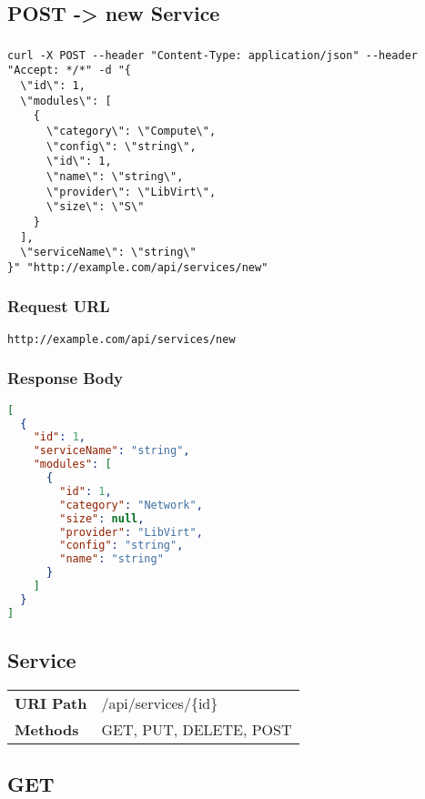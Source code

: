 \subsection{POST -> new Service}
\subsubsection{}
\begin{lstlisting}[style=Bash] 
curl -X POST --header "Content-Type: application/json" --header "Accept: */*" -d "{
  \"id\": 1,
  \"modules\": [
    {
      \"category\": \"Compute\",
      \"config\": \"string\",
      \"id\": 1,
      \"name\": \"string\",
      \"provider\": \"LibVirt\",
      \"size\": \"S\"
    }
  ],
  \"serviceName\": \"string\"
}" "http://example.com/api/services/new"
\end{lstlisting}

\subsubsection{Request URL}
\begin{lstlisting}[] 
http://example.com/api/services/new
\end{lstlisting}

\subsubsection{Response Body}
\begin{lstlisting}[language=json] 
[
  {
    "id": 1,
    "serviceName": "string",
    "modules": [
      {
        "id": 1,
        "category": "Network",
        "size": null,
        "provider": "LibVirt",
        "config": "string",
        "name": "string"
      }
    ]
  }
]
\end{lstlisting}





\subsection{Service}
\begin{tabularx}{\linewidth}{l l}
\textbf{URI Path} & /api/services/\{id\}\\
\textbf{Methods} & GET, PUT, DELETE, POST\\
\end{tabularx}

\subsection{GET}
